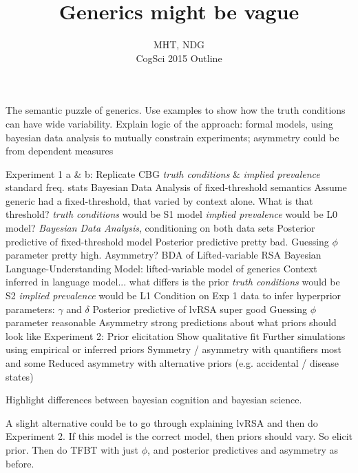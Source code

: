 \documentclass{article}
\begin{document}
\title{Generics might be vague}
\author{MHT, NDG\\CogSci 2015 Outline} \maketitle
 
\begin{outline}
  \0 The semantic puzzle of generics. Use examples to show how the truth conditions can have wide variability. Explain logic of the approach: formal models, using bayesian data analysis to mutually constrain experiments; asymmetry could be from dependent measures
  
		\1 Experiment 1 a \& b: Replicate CBG \emph{truth conditions} \& \emph{implied prevalence}
			\2 standard freq. stats
		\1 Bayesian Data Analysis of fixed-threshold semantics
			\2  Assume generic had a fixed-threshold, that varied by context alone. What is that threshold? 
				\3 \emph{truth conditions} would be S1 model
				\3 \emph{implied prevalence} would be L0 model?
			\2 \emph{Bayesian Data Analysis}, conditioning on both data sets
				\3 Posterior predictive of fixed-threshold model
				\3 Posterior predictive pretty bad.
				\3 Guessing $\phi$ parameter pretty high.
				\3 Asymmetry?
		\1 BDA of Lifted-variable RSA
			\2 Bayesian Language-Understanding Model: lifted-variable model of generics
			\2 Context inferred in language model... what differs is the prior
				\3 \emph{truth conditions} would be S2
				\3 \emph{implied prevalence} would be L1
			\2 Condition on Exp 1 data to infer hyperprior parameters: $\gamma$ and $\delta$ 
				\3 Posterior predictive of lvRSA super good
				\3 Guessing $\phi$ parameter reasonable
				\3 Asymmetry
			\2  strong predictions about what priors should look like
		\1 Experiment 2: Prior elicitation
			\2 Show qualitative fit 
		\1 Further simulations using empirical or inferred priors
			\2 Symmetry / asymmetry with quantifiers most and some
			\2 Reduced asymmetry with alternative priors (e.g. accidental / disease states)
				
							
\0 Highlight differences between bayesian cognition and bayesian science.
 \end{outline}


\vspace{2cm}
A slight alternative could be to go through explaining lvRSA and then do Experiment 2. If this model is the correct model, then priors should vary. So elicit prior. Then do TFBT with just $\phi$, and posterior predictives and asymmetry as before.
	
\end{document}

